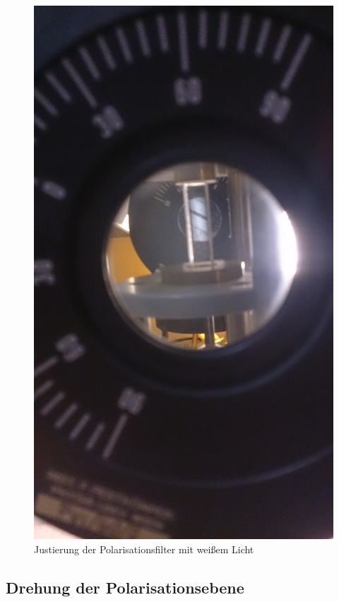 \documentclass[12pt,a4paper]{article}
\begin{document}
\begin{multicols}{2}
\begin{figure}[H]
	\centering
	\includegraphics[scale=0.055]{./data/PS5_2_Filterjustierung.jpg}
	\caption{Justierung der Polarisationsfilter mit weißem Licht}
	\label{fig:spannung_justierung}
\end{figure}

\subsection{Drehung der Polarisationsebene}


\end{multicols}
\end{document}
